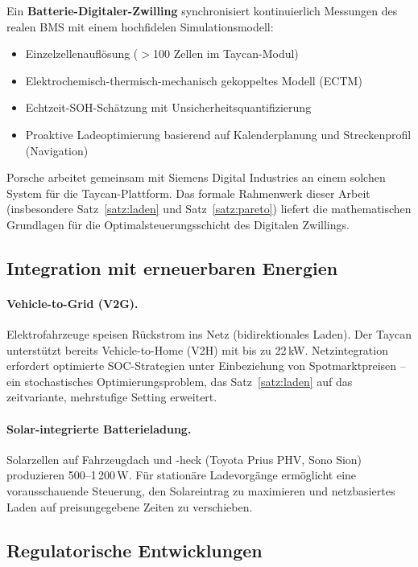 ﻿\documentclass[a4paper,12pt]{article}
\theoremstyle{definition}
\begin{document}
Ein \textbf{Batterie-Digitaler-Zwilling} synchronisiert kontinuierlich
Messungen des realen BMS mit einem hochfidelen Simulationsmodell:
\begin{itemize}
  \item Einzelzellenaufl\"osung ($>$100 Zellen im Taycan-Modul)
  \item Elektrochemisch-thermisch-mechanisch gekoppeltes Modell (ECTM)
  \item Echtzeit-SOH-Sch\"atzung mit Unsicherheitsquantifizierung
  \item Proaktive Ladeoptimierung basierend auf Kalenderplanung und
    Streckenprofil (Navigation)
\end{itemize}

Porsche arbeitet gemeinsam mit Siemens Digital Industries an einem
solchen System f\"ur die Taycan-Plattform. Das formale Rahmenwerk dieser Arbeit
(insbesondere Satz~\ref{satz:laden} und Satz~\ref{satz:pareto}) liefert die
mathematischen Grundlagen f\"ur die Optimalsteuerungsschicht des Digitalen Zwillings.

\subsection{Integration mit erneuerbaren Energien}

\paragraph{Vehicle-to-Grid (V2G).}
Elektrofahrzeuge speisen R\"uckstrom ins Netz (bidirektionales Laden).
Der Taycan unterst\"utzt bereits Vehicle-to-Home (V2H) mit bis zu 22\,kW.
Netzintegration erfordert optimierte SOC-Strategien unter Einbeziehung
von Spotmarktpreisen -- ein stochastisches Optimierungsproblem, das
Satz~\ref{satz:laden} auf das zeitvariante, mehrstufige Setting erweitert.

\paragraph{Solar-integrierte Batterieladung.}
Solarzellen auf Fahrzeugdach und -heck (Toyota Prius PHV, Sono Sion)
produzieren 500--1\,200\,W. F\"ur station\"are Ladevorg\"ange erm\"oglicht
eine vorausschauende Steuerung, den Solareintrag zu maximieren und
netzbasiertes Laden auf preisungegebene Zeiten zu verschieben.

\subsection{Regulatorische Entwicklungen}
\end{document}

